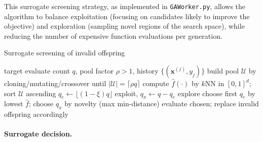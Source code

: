 \documentclass[12pt,a4paper]{article}
\begin{document}
This surrogate screening strategy, as implemented in \texttt{GAWorker.py}, allows the algorithm to balance exploitation (focusing on candidates likely to improve the objective) and exploration (sampling novel regions of the search space), while reducing the number of expensive function evaluations per generation.

\begin{algorithm}[H]
\caption{Surrogate screening of invalid offspring}
\begin{algorithmic}[1]
\Require target evaluate count $q$, pool factor $\rho>1$, history $\{(\bm{x}^{(j)},y_j)\}$
\State build pool $\mathcal{U}$ by cloning/mutating/crossover until $|\mathcal{U}|=\lceil \rho q\rceil$
\State compute $\hat{f}(\cdot)$ by $k$NN in $[0,1]^d$; sort $\mathcal{U}$ ascending
\State $q_e\leftarrow \lfloor (1-\xi) q\rfloor$ exploit, $q_x\leftarrow q-q_e$ explore
\State choose first $q_e$ by lowest $\hat{f}$; choose $q_x$ by novelty (max min-distance)
\State evaluate chosen; replace invalid offspring accordingly
\end{algorithmic}
\end{algorithm}

\paragraph{Surrogate decision.}
\begin{center}
\end{center}
\end{document}
